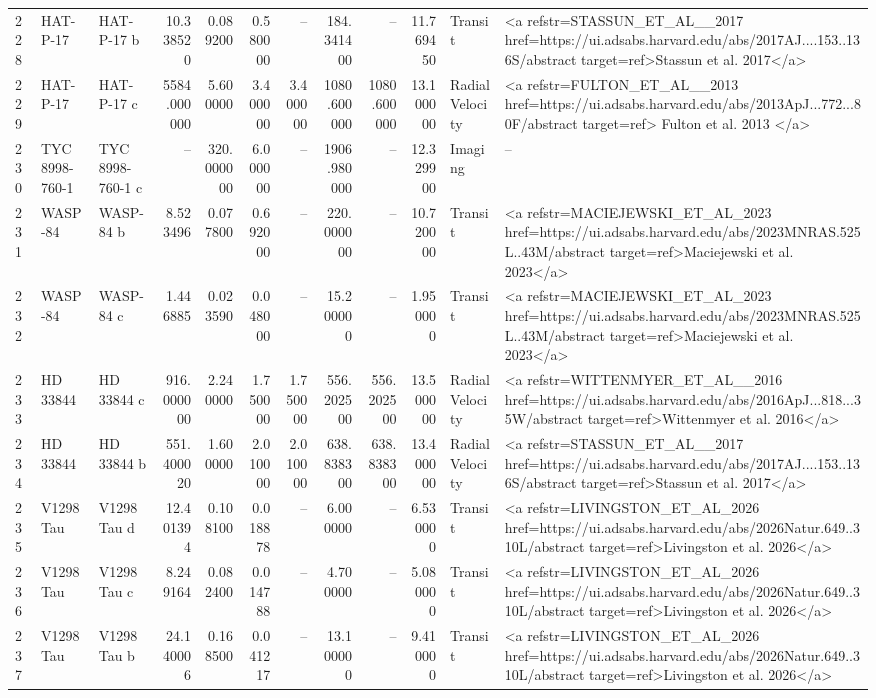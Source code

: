 \begin{tabular}{lllrrrrrrrll}
228 & HAT-P-17 & HAT-P-17 b & 10.338520 & 0.089200 & 0.580000 & -- & 184.341400 & -- & 11.769450 & Transit & <a refstr=STASSUN_ET_AL__2017 href=https://ui.adsabs.harvard.edu/abs/2017AJ....153..136S/abstract target=ref>Stassun et al. 2017</a> \\
229 & HAT-P-17 & HAT-P-17 c & 5584.000000 & 5.600000 & 3.400000 & 3.400000 & 1080.600000 & 1080.600000 & 13.100000 & Radial Velocity & <a refstr=FULTON_ET_AL__2013 href=https://ui.adsabs.harvard.edu/abs/2013ApJ...772...80F/abstract target=ref> Fulton et al. 2013 </a> \\
230 & TYC 8998-760-1 & TYC 8998-760-1 c & -- & 320.000000 & 6.000000 & -- & 1906.980000 & -- & 12.329900 & Imaging & -- \\
231 & WASP-84 & WASP-84 b & 8.523496 & 0.077800 & 0.692000 & -- & 220.000000 & -- & 10.720000 & Transit & <a refstr=MACIEJEWSKI_ET_AL_2023 href=https://ui.adsabs.harvard.edu/abs/2023MNRAS.525L..43M/abstract target=ref>Maciejewski et al. 2023</a> \\
232 & WASP-84 & WASP-84 c & 1.446885 & 0.023590 & 0.048000 & -- & 15.200000 & -- & 1.950000 & Transit & <a refstr=MACIEJEWSKI_ET_AL_2023 href=https://ui.adsabs.harvard.edu/abs/2023MNRAS.525L..43M/abstract target=ref>Maciejewski et al. 2023</a> \\
233 & HD 33844 & HD 33844 c & 916.000000 & 2.240000 & 1.750000 & 1.750000 & 556.202500 & 556.202500 & 13.500000 & Radial Velocity & <a refstr=WITTENMYER_ET_AL__2016 href=https://ui.adsabs.harvard.edu/abs/2016ApJ...818...35W/abstract target=ref>Wittenmyer et al. 2016</a> \\
234 & HD 33844 & HD 33844 b & 551.400020 & 1.600000 & 2.010000 & 2.010000 & 638.838300 & 638.838300 & 13.400000 & Radial Velocity & <a refstr=STASSUN_ET_AL__2017 href=https://ui.adsabs.harvard.edu/abs/2017AJ....153..136S/abstract target=ref>Stassun et al. 2017</a> \\
235 & V1298 Tau & V1298 Tau d & 12.401394 & 0.108100 & 0.018878 & -- & 6.000000 & -- & 6.530000 & Transit & <a refstr=LIVINGSTON_ET_AL_2026 href=https://ui.adsabs.harvard.edu/abs/2026Natur.649..310L/abstract target=ref>Livingston et al. 2026</a> \\
236 & V1298 Tau & V1298 Tau c & 8.249164 & 0.082400 & 0.014788 & -- & 4.700000 & -- & 5.080000 & Transit & <a refstr=LIVINGSTON_ET_AL_2026 href=https://ui.adsabs.harvard.edu/abs/2026Natur.649..310L/abstract target=ref>Livingston et al. 2026</a> \\
237 & V1298 Tau & V1298 Tau b & 24.140006 & 0.168500 & 0.041217 & -- & 13.100000 & -- & 9.410000 & Transit & <a refstr=LIVINGSTON_ET_AL_2026 href=https://ui.adsabs.harvard.edu/abs/2026Natur.649..310L/abstract target=ref>Livingston et al. 2026</a> \\

\end{tabular}

